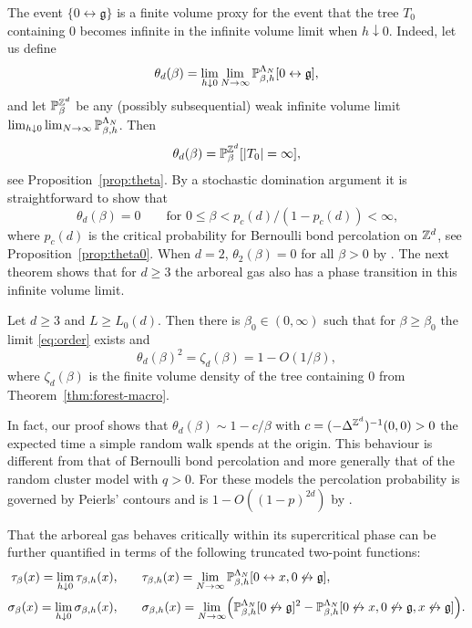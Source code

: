 \documentclass[11pt]{amsart}
\numberwithin{equation}{section}
\numberwithin{theorem}{section}
\newcommand{\ghost}{\mathfrak{g}}
\newcommand{\conn}{\leftrightarrow}
\newcommand{\nconn}{\not\leftrightarrow}
\newcommand{\1}{{\bf 1}}
\begin{document}
The event $\{0\conn\ghost\}$ is a finite volume proxy for the event
that the tree $T_0$ containing $0$ becomes infinite in the infinite
volume limit when $h\downarrow 0$. 
Indeed, let us define
\begin{equation}
  \label{eq:order}
  \theta_d(\beta)
  \bydef \lim_{h\downarrow 0}\lim_{N\to\infty} \P^{\Lambda_N}_{\beta,h}[0\conn \ghost],
\end{equation}
and let $\P_\beta^{\Z^d}$ be any (possibly subsequential) weak
infinite volume limit
$\lim_{h\downarrow 0}\lim_{N\to\infty}\P^{\Lambda_N}_{\beta,h}$.
Then 
\begin{equation}
\theta_d(\beta)=\P_\beta^{\Z^d}[|T_0|=\infty],
\end{equation}
see Proposition~\ref{prop:theta}.
By a stochastic domination argument it
is straightforward to show that 
\begin{equation}
  \label{eq:th0}
  \theta_d(\beta) =0 \qquad \text{for $0\leq \beta<p_c(d)/(1-p_c(d))<\infty$,}
\end{equation}
where $p_c(d)$ is the critical probability for Bernoulli bond
percolation on $\Z^d$, see Proposition~\ref{prop:theta0}. 
When $d=2$,
$\theta_2(\beta) = 0$ for all $\beta>0$ by
\cite[Section~4.2]{MR4218682}.  The next theorem shows that for
$d\geq 3$ the arboreal gas also has
a phase transition in this infinite volume limit. 

\begin{theorem}
  \label{thm:forests0}
  Let $d\geq 3$ and $L \geq L_0(d)$. Then there is
  $\beta_0 \in (0,\infty)$ such that
  for $\beta\geq \beta_0$
  the limit \eqref{eq:order} exists and 
  \begin{equation}
    \label{e:thm-forest-theta}
    \theta_{d}(\beta)^2 = \zeta_d(\beta)
    = 1-O(1/\beta),
  \end{equation}
  where $\zeta_d(\beta)$ is the finite volume density of the tree containing $0$
    from Theorem~\ref{thm:forest-macro}.
\end{theorem}

In fact, our proof shows that $\theta_d(\beta)\sim 1-c/\beta$
with $c=(-\Delta^{\Z^d})^{-1}(0,0)>0$ the expected time a simple random
walk spends at the origin.  This behaviour is different from that of
Bernoulli bond percolation and more generally that of the random
cluster model with $q>0$.  For these models the percolation
probability is governed by Peierls' contours and is $1-O((1-p)^{2d})$
by \cite[Remark~5.10]{MR2410872}.

That the arboreal gas behaves critically within its supercritical
phase can be further quantified in terms of the following truncated
two-point functions:
\begin{align}
  \label{e:tau-def}
  \tau_{\beta}(x) = \lim_{h\downarrow 0} \tau_{\beta,h}(x),
  &  \qquad
    \tau_{\beta,h}(x)=\lim_{N\to\infty}\P_{\beta,h}^{\Lambda_N}[0\conn x, 0 \nconn\ghost],\\
    \label{e:sigma-def}
  \sigma_{\beta}(x) = \lim_{h\downarrow 0} \sigma_{\beta,h}(x),
  & \qquad
    \sigma_{\beta,h}(x) = \lim_{N\to\infty}\pB{\P_{\beta,h}^{\Lambda_N}[0\nconn \ghost]^2 - \P_{\beta,h}^{\Lambda_N}[0\nconn x, 0\nconn \ghost,x\nconn\ghost]}.
\end{align}
\end{document}

